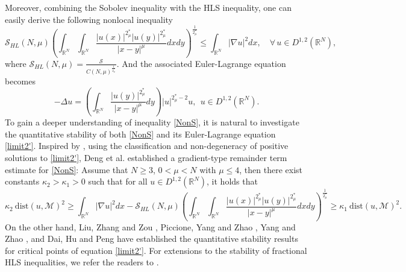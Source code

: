 \documentclass[11pt]{article}
\begin{document}
Moreover, combining the Sobolev inequality with the HLS
inequality, one can easily derive the following nonlocal inequality
\begin{equation}\label{NonS}
	\mathcal{S}_{HL}(N,\mu)	\left(
\int_{\mathbb{R}^{N}}\int_{\mathbb{R}^{N}}
\frac{|u(x)|^{2_\mu^*}|u(y)|^{2_\mu^*}}{|x-y|^\mu}dxdy
\right)^{\frac{1}{2^{\ast}_{\mu}}}\leq \int_{\mathbb{R}^{N}}|\nabla u|^{2}d x,\quad \forall \,  u\in D^{1,2}(\mathbb{R}^{N}),
\end{equation}
where $\mathcal{S}_{HL}(N,\mu)=\frac{\mathcal{S}}{C(N,\mu)^{\frac{1}{2_\mu^*}}}$.
And the associated Euler-Lagrange equation becomes
\begin{equation}\label{limit2'}
  -\Delta u=\left(\int_{\mathbb{R}^{N}}\frac{|u(y)|
^{2^{\ast}_{\mu}}}{|x-y|^{\mu}}dy \right)|u|^{2_\mu^*-2}u,~~u\in D^{1,2}(\mathbb{R}^{N}).
\end{equation}
To gain a deeper understanding of inequality \eqref{NonS}, it is natural to investigate the quantitative stability of both \eqref{NonS} and its Euler-Lagrange equation \eqref{limit2'}.
Inspired by \cite{BE91}, using the classification \cite{DY19,GHPS19} and non-degeneracy \cite{LLTX23} of positive solutions
 to \eqref{limit2'},
 Deng et al. \cite{DTYZ23} established a gradient-type remainder term estimate for \eqref{NonS}: Assume that $N\geq3$, $0<\mu<N$ with $\mu\leq 4$, then there exist constants $\kappa_2>\kappa_1>0$ such that for all $u\in{D}^{1,2}(\mathbb{R}^{N})$, it holds that
\begin{equation*}
\kappa_2 ~  \mathrm{dist}(u,\mathcal{M})^2\geq  \int_{\mathbb{R}^{N}}|\nabla u|^{2}{d}x-\mathcal{S}_{HL}(N,\mu)\left(
\int_{\mathbb{R}^{N}}\int_{\mathbb{R}^{N}}
\frac{|u(x)|^{2_\mu^*}|u(y)|^{2_\mu^*}}{|x-y|^\mu}dxdy
\right)^{\frac{1}{2^{\ast}_{\mu}}}\geq \kappa_1 ~  \mathrm{dist}(u,\mathcal{M})^2.
\end{equation*}
  On the other hand, Liu, Zhang and Zou \cite{LZZ23}, Piccione, Yang and Zhao \cite{PYZ25}, Yang and Zhao \cite{YZ252}, and Dai, Hu and Peng \cite{DHP25} have established the quantitative stability results for critical points
 of equation \eqref{limit2'}. For extensions to the stability of fractional HLS inequalities, we refer the readers to \cite{LYZ25}.%
\end{document}
